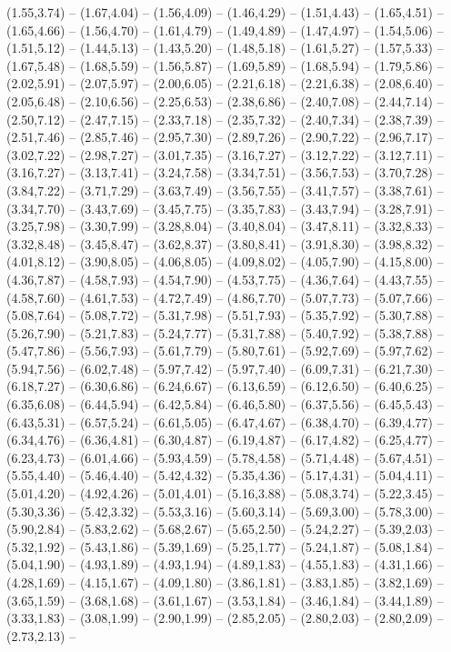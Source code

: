 \providecommand\Heute[1]{\csname geo:Heute:#1\endcsname}
\def\HeuteListe{DEU,Ost,West,Grenze}
\expandafter\def\csname geo:Heute:DEU\endcsname{
  (1.55,3.74) -- (1.67,4.04) -- (1.56,4.09) -- (1.46,4.29) -- (1.51,4.43) -- (1.65,4.51) -- (1.65,4.66) -- (1.56,4.70) -- (1.61,4.79) -- (1.49,4.89) -- (1.47,4.97) -- (1.54,5.06) -- (1.51,5.12) -- (1.44,5.13) -- (1.43,5.20) -- (1.48,5.18) -- (1.61,5.27) -- (1.57,5.33) -- (1.67,5.48) -- (1.68,5.59) -- (1.56,5.87) -- (1.69,5.89) -- (1.68,5.94) -- (1.79,5.86) -- (2.02,5.91) -- (2.07,5.97) -- (2.00,6.05) -- (2.21,6.18) -- (2.21,6.38) -- (2.08,6.40) -- (2.05,6.48) -- (2.10,6.56) -- (2.25,6.53) -- (2.38,6.86) -- (2.40,7.08) -- (2.44,7.14) -- (2.50,7.12) -- (2.47,7.15) -- (2.33,7.18) -- (2.35,7.32) -- (2.40,7.34) -- (2.38,7.39) -- (2.51,7.46) -- (2.85,7.46) -- (2.95,7.30) -- (2.89,7.26) -- (2.90,7.22) -- (2.96,7.17) -- (3.02,7.22) -- (2.98,7.27) -- (3.01,7.35) -- (3.16,7.27) -- (3.12,7.22) -- (3.12,7.11) -- (3.16,7.27) -- (3.13,7.41) -- (3.24,7.58) -- (3.34,7.51) -- (3.56,7.53) -- (3.70,7.28) -- (3.84,7.22) -- (3.71,7.29) -- (3.63,7.49) -- (3.56,7.55) -- (3.41,7.57) -- (3.38,7.61) -- (3.34,7.70) -- (3.43,7.69) -- (3.45,7.75) -- (3.35,7.83) -- (3.43,7.94) -- (3.28,7.91) -- (3.25,7.98) -- (3.30,7.99) -- (3.28,8.04) -- (3.40,8.04) -- (3.47,8.11) -- (3.32,8.33) -- (3.32,8.48) -- (3.45,8.47) -- (3.62,8.37) -- (3.80,8.41) -- (3.91,8.30) -- (3.98,8.32) -- (4.01,8.12) -- (3.90,8.05) -- (4.06,8.05) -- (4.09,8.02) -- (4.05,7.90) -- (4.15,8.00) -- (4.36,7.87) -- (4.58,7.93) -- (4.54,7.90) -- (4.53,7.75) -- (4.36,7.64) -- (4.43,7.55) -- (4.58,7.60) -- (4.61,7.53) -- (4.72,7.49) -- (4.86,7.70) -- (5.07,7.73) -- (5.07,7.66) -- (5.08,7.64) -- (5.08,7.72) -- (5.31,7.98) -- (5.51,7.93) -- (5.35,7.92) -- (5.30,7.88) -- (5.26,7.90) -- (5.21,7.83) -- (5.24,7.77) -- (5.31,7.88) -- (5.40,7.92) -- (5.38,7.88) -- (5.47,7.86) -- (5.56,7.93) -- (5.61,7.79) -- (5.80,7.61) -- (5.92,7.69) -- (5.97,7.62) -- (5.94,7.56) -- (6.02,7.48) -- (5.97,7.42) -- (5.97,7.40) -- (6.09,7.31) -- (6.21,7.30) -- (6.18,7.27) -- (6.30,6.86) -- (6.24,6.67) -- (6.13,6.59) -- (6.12,6.50) -- (6.40,6.25) -- (6.35,6.08) -- (6.44,5.94) -- (6.42,5.84) -- (6.46,5.80) -- (6.37,5.56) -- (6.45,5.43) -- (6.43,5.31) -- (6.57,5.24) -- (6.61,5.05) -- (6.47,4.67) -- (6.38,4.70) -- (6.39,4.77) -- (6.34,4.76) -- (6.36,4.81) -- (6.30,4.87) -- (6.19,4.87) -- (6.17,4.82) -- (6.25,4.77) -- (6.23,4.73) -- (6.01,4.66) -- (5.93,4.59) -- (5.78,4.58) -- (5.71,4.48) -- (5.67,4.51) -- (5.55,4.40) -- (5.46,4.40) -- (5.42,4.32) -- (5.35,4.36) -- (5.17,4.31) -- (5.04,4.11) -- (5.01,4.20) -- (4.92,4.26) -- (5.01,4.01) -- (5.16,3.88) -- (5.08,3.74) -- (5.22,3.45) -- (5.30,3.36) -- (5.42,3.32) -- (5.53,3.16) -- (5.60,3.14) -- (5.69,3.00) -- (5.78,3.00) -- (5.90,2.84) -- (5.83,2.62) -- (5.68,2.67) -- (5.65,2.50) -- (5.24,2.27) -- (5.39,2.03) -- (5.32,1.92) -- (5.43,1.86) -- (5.39,1.69) -- (5.25,1.77) -- (5.24,1.87) -- (5.08,1.84) -- (5.04,1.90) -- (4.93,1.89) -- (4.93,1.94) -- (4.89,1.83) -- (4.55,1.83) -- (4.31,1.66) -- (4.28,1.69) -- (4.15,1.67) -- (4.09,1.80) -- (3.86,1.81) -- (3.83,1.85) -- (3.82,1.69) -- (3.65,1.59) -- (3.68,1.68) -- (3.61,1.67) -- (3.53,1.84) -- (3.46,1.84) -- (3.44,1.89) -- (3.33,1.83) -- (3.08,1.99) -- (2.90,1.99) -- (2.85,2.05) -- (2.80,2.03) -- (2.80,2.09) -- (2.73,2.13) -- }
